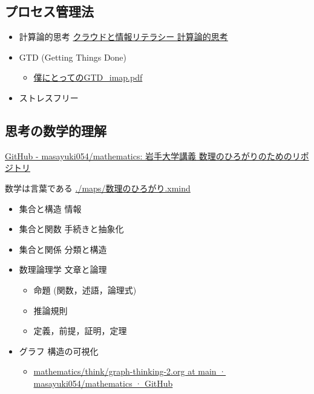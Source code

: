 \documentclass[dvipdfmx,11pat]{jarticle}
\begin{document}
\subsection{プロセス管理法}
\label{sec:orga55be64}
\begin{itemize}
\item 計算論的思考 \href{https://masayuki054.github.io/cloud\_and\_information\_literacy/docs/computational\_thinking.html}{クラウドと情報リテラシー 計算論的思考}
\item GTD (Getting Things Done)
\begin{itemize}
\item \href{https://masayuki054.github.io/cloud\_and\_information\_literacy/i\_maps/\%E5\%83\%95\%E3\%81\%AB\%E3\%81\%A8\%E3\%81\%A3\%E3\%81\%A6\%E3\%81\%AEGTD\_imap.pdf}{僕にとってのGTD\_imap.pdf}
\end{itemize}
\item ストレスフリー
\end{itemize}
\subsection{思考の数学的理解}
\label{sec:orgcba00ed}
\href{https://github.com/masayuki054/mathematics/tree/main}{GitHub - masayuki054/mathematics: 岩手大学講義 数理のひろがりのためのリポジトリ}

数学は言葉である \url{./maps/数理のひろがり.xmind} 
\begin{itemize}
\item 集合と構造 情報
\item 集合と関数 手続きと抽象化
\item 集合と関係 分類と構造
\item 数理論理学 文章と論理
\begin{itemize}
\item 命題 (関数，述語，論理式)
\item 推論規則
\item 定義，前提，証明，定理
\end{itemize}
\item グラフ 構造の可視化
\begin{itemize}
\item \href{https://github.com/masayuki054/mathematics/blob/main/think/graph-thinking-2.org}{mathematics/think/graph-thinking-2.org at main · masayuki054/mathematics · GitHub}
\end{itemize}
\end{itemize}
\end{document}
